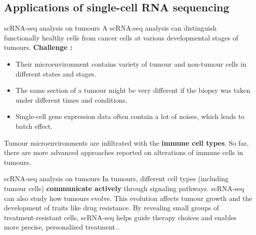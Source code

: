 \documentclass[12pt, aspectratio=43]{beamer}
\begin{document}
\subsection{Applications of single-cell RNA sequencing}
\begin{frame}{scRNA-seq analysis on tumours}
	 A scRNA-seq analysis can distinguish functionally healthy cells from cancer cells at various developmental stages of tumours.
	 \textbf{Challenge :}
	 \begin{itemize}
	 	\item Their microenvironment contains variety of tumour and non-tumour cells in different states and stages. 
	 	\item The same section of a tumour might be very different if the biopsy was taken under different times and conditions.
	 	\item Single-cell gene expression data often contain a lot of noises, which leads to batch effect.
	 \end{itemize}
	 Tumour microenvironments are infiltrated with the \textbf{immune cell types}. So far, there are more advanced approaches reported on alterations of immune cells in tumours.
\end{frame}

\begin{frame}{scRNA-seq analysis on tumours}
	In tumours, different cell types (including tumour cells) \textbf{communicate actively} through signaling pathways.
	\vskip 0.2cm
	scRNA-seq can also study how tumours evolve. This evolution affects tumour growth and the development of traits like drug resistance. 
	\vskip 0.2cm
	By revealing small groups of treatment-resistant cells, scRNA-seq helps guide therapy choices and enables more precise, personalized treatment..
\end{frame}





\end{document}
